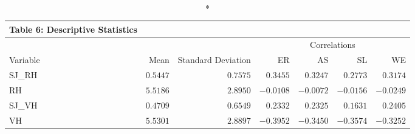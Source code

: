 \begin{longtable}{lrrrrrr}
\caption*{
{\large Table 6: Descriptive Statistics}
} \\ 
\toprule
 &  &  & \multicolumn{4}{c}{Correlations} \\ 
\cmidrule(lr){4-7}
Variable & Mean & Standard Deviation & ER & AS & SL & WE \\ 
\midrule
SJ\_RH & $0.5447$ & $0.7575$ & $0.3455$ & $0.3247$ & $0.2773$ & $0.3174$ \\ 
RH & $5.5186$ & $2.8950$ & $-0.0108$ & $-0.0072$ & $-0.0156$ & $-0.0249$ \\ 
SJ\_VH & $0.4709$ & $0.6549$ & $0.2332$ & $0.2325$ & $0.1631$ & $0.2405$ \\ 
VH & $5.5301$ & $2.8897$ & $-0.3952$ & $-0.3450$ & $-0.3574$ & $-0.3252$ \\ 
\bottomrule
\end{longtable}

